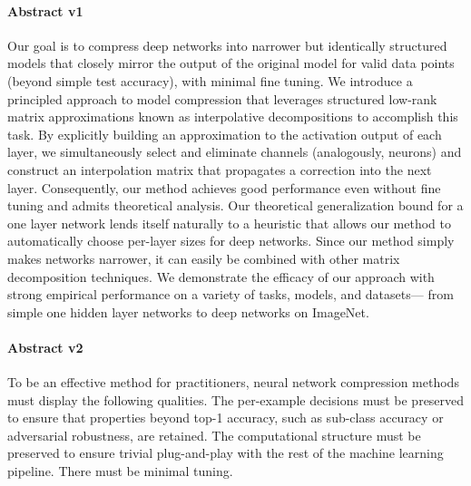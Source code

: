 \paragraph{Abstract v1}
Our goal is to compress deep networks into narrower but identically structured models that closely mirror the output of the original model for valid data points (beyond simple test accuracy), with minimal fine tuning.   We introduce a principled approach to model compression that leverages structured low-rank matrix approximations known as interpolative decompositions to accomplish this task. By explicitly building an approximation to the activation output of each layer, we simultaneously select and eliminate channels (analogously, neurons) and construct an interpolation matrix that propagates a correction into the next layer.  Consequently, our method achieves good performance even without fine tuning and admits theoretical analysis.  Our theoretical generalization bound for a one layer network lends itself naturally to a heuristic that allows our method to automatically choose per-layer sizes for deep networks. Since our method simply makes networks narrower, it can easily be combined with other matrix decomposition techniques. We demonstrate the efficacy of our approach with strong empirical performance on a variety of tasks, models, and datasets--- from simple one hidden layer networks to deep networks on ImageNet. 


\paragraph{Abstract v2}
To be an effective method for practitioners, neural network compression methods must display the following qualities.
The per-example decisions must be preserved to ensure that properties beyond top-1 accuracy, such as sub-class accuracy or adversarial robustness, are retained.
The computational structure must be preserved to ensure trivial plug-and-play with the rest of the machine learning pipeline.
There must be minimal tuning.

